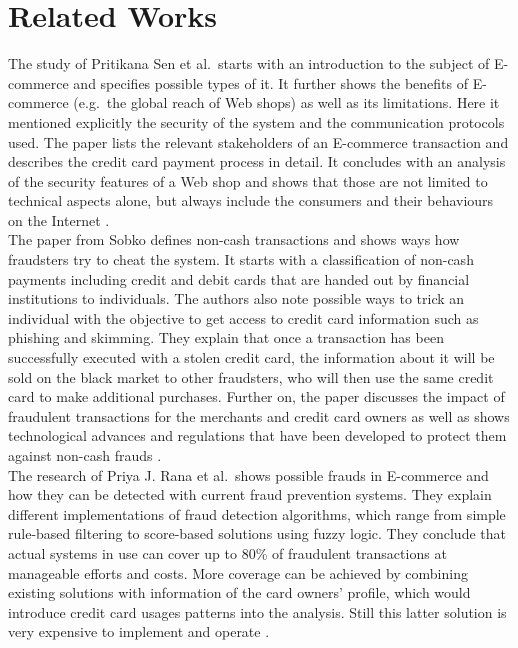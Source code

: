 
\chapter{Related Works}
\label{cha:related_works}

The study of Pritikana Sen et al.\ starts with an introduction to the subject of \gls{E-commerce} and specifies possible types of it. It further shows the benefits of \gls{E-commerce} (e.g.\ the global reach of Web shops) as well as its limitations. Here it mentioned explicitly the security of the system and the communication protocols used. The paper lists the relevant stakeholders of an \gls{E-commerce} transaction and describes the credit card payment process in detail. It concludes with an analysis of the security features of a Web shop and shows that those are not limited to technical aspects alone, but always include the consumers and their behaviours on the Internet \citep{sen2015study}. \\

The paper from Sobko defines non-cash transactions and shows ways how fraudsters try to cheat the system. It starts with a classification of non-cash payments including credit and debit cards that are handed out by financial institutions to individuals. The authors also note possible ways to trick an individual with the objective to get access to credit card information such as phishing and skimming. They explain that once a transaction has been successfully executed with a stolen credit card, the information about it will be sold on the black market to other fraudsters, who will then use the same credit card to make additional purchases. Further on, the paper discusses the impact of fraudulent transactions for the merchants and credit card owners as well as shows technological advances and regulations that have been developed to protect them against non-cash frauds \citep{sobko2014fraud}. \\

The research of Priya J. Rana et al.\ shows possible frauds in \gls{E-commerce} and how they can be detected with current fraud prevention systems. They explain different implementations of fraud detection algorithms, which range from simple rule-based filtering to score-based solutions using fuzzy logic. They conclude that actual systems in use can cover up to 80\% of fraudulent transactions at manageable efforts and costs. More coverage can be achieved by combining existing solutions with information of the card owners' profile, which would introduce credit card usages patterns into the analysis. Still this latter solution is very expensive to implement and operate \citep{rana2015survey}. \\

